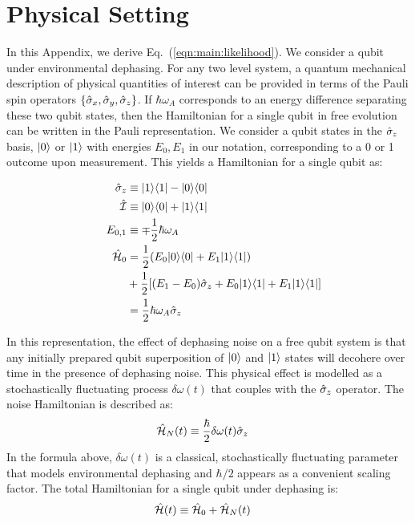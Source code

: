

\section{Physical Setting \label{sec:app:setup_1}}

In this Appendix, we derive Eq.~(\ref {eqn:main:likelihood}). We consider a qubit under environmental dephasing.  For any two level system, a quantum mechanical description of physical quantities of interest can be provided in terms of the Pauli spin operators $\{ \hat{\sigma}_{x}, \hat{\sigma}_{y}, \hat{\sigma}_{z}\}$. If $\hbar \omega_A$ corresponds to an energy difference separating these two qubit states, then the Hamiltonian for a single qubit in free evolution can be written in the Pauli representation. We consider a qubit states in the $\hat{\sigma}_{z}$ basis, $| 0 \rangle$ or $| 1 \rangle$ with energies $E_0, E_1$ in our notation, corresponding to a 0 or 1 outcome upon measurement. This yields a Hamiltonian for a single qubit as:

\begin{align}
\hat{\sigma}_{z} &\equiv | 1 \rangle\langle 1 | - | 0 \rangle\langle 0 | \\
\hat{\mathcal{I}} & \equiv | 0 \rangle\langle 0 | + | 1 \rangle\langle 1 | \\
\quad E_{0,1} &\equiv \mp \frac{1}{2} \hbar \omega_A \\
\hat{\mathcal{H}}_0 & = \frac{1}{2} (E_0| 0 \rangle\langle 0 |+ E_1| 1 \rangle\langle 1 |) \\
& + \frac{1}{2} [(E_1 - E_0)\hat{\sigma}_{z} + E_0 | 1 \rangle\langle 1 | + E_1 | 1 \rangle\langle 1 |]\\
 &= \frac{1}{2} \hbar \omega_A \hat{\sigma}_{z}
\end{align}

In this representation, the effect of dephasing noise on a free qubit system is that any initially prepared qubit superposition of $| 0 \rangle$ and $| 1 \rangle$ states will decohere over time in the presence of dephasing noise. This physical effect is modelled as a stochastically fluctuating process $\delta\omega(t)$ that couples with the $\hat{\sigma}_{z}$ operator. The noise Hamiltonian is described as:
\begin{align} 
\hat{\mathcal{H}}_{N}(t) & \equiv \frac{\hbar}{2}\delta\omega(t)\hat{\sigma}_{z}
\end{align}
In the formula above, $\delta\omega(t)$ is a classical, stochastically fluctuating parameter that models environmental dephasing and $\hbar/2$ appears as a convenient scaling factor. The total Hamiltonian for a single qubit under dephasing is:
\begin{align} 
\hat{\mathcal{H}}(t) &\equiv \hat{\mathcal{H}}_0 + \hat{\mathcal{H}}_{N}(t)
\end{align}

